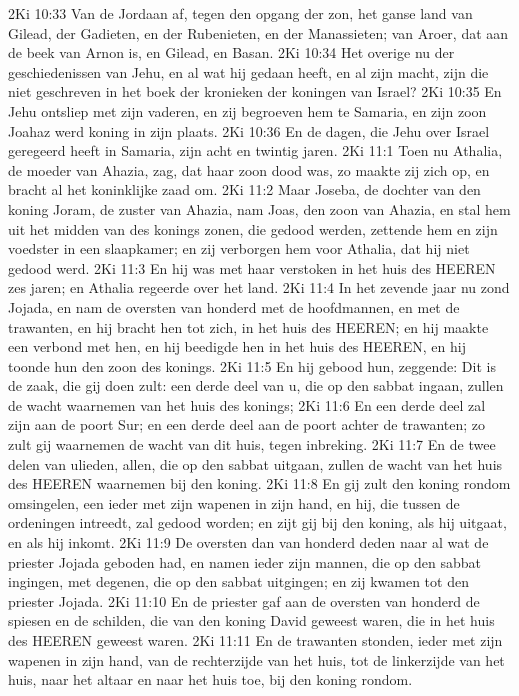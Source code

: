 2Ki 10:33  Van de Jordaan af, tegen den opgang der zon, het ganse land van Gilead, der Gadieten, en der Rubenieten, en der Manassieten; van Aroer, dat aan de beek van Arnon is, en Gilead, en Basan.
2Ki 10:34  Het overige nu der geschiedenissen van Jehu, en al wat hij gedaan heeft, en al zijn macht, zijn die niet geschreven in het boek der kronieken der koningen van Israel?
2Ki 10:35  En Jehu ontsliep met zijn vaderen, en zij begroeven hem te Samaria, en zijn zoon Joahaz werd koning in zijn plaats.
2Ki 10:36  En de dagen, die Jehu over Israel geregeerd heeft in Samaria, zijn acht en twintig jaren.
2Ki 11:1  Toen nu Athalia, de moeder van Ahazia, zag, dat haar zoon dood was, zo maakte zij zich op, en bracht al het koninklijke zaad om.
2Ki 11:2  Maar Joseba, de dochter van den koning Joram, de zuster van Ahazia, nam Joas, den zoon van Ahazia, en stal hem uit het midden van des konings zonen, die gedood werden, zettende hem en zijn voedster in een slaapkamer; en zij verborgen hem voor Athalia, dat hij niet gedood werd.
2Ki 11:3  En hij was met haar verstoken in het huis des HEEREN zes jaren; en Athalia regeerde over het land.
2Ki 11:4  In het zevende jaar nu zond Jojada, en nam de oversten van honderd met de hoofdmannen, en met de trawanten, en hij bracht hen tot zich, in het huis des HEEREN; en hij maakte een verbond met hen, en hij beedigde hen in het huis des HEEREN, en hij toonde hun den zoon des konings.
2Ki 11:5  En hij gebood hun, zeggende: Dit is de zaak, die gij doen zult: een derde deel van u, die op den sabbat ingaan, zullen de wacht waarnemen van het huis des konings;
2Ki 11:6  En een derde deel zal zijn aan de poort Sur; en een derde deel aan de poort achter de trawanten; zo zult gij waarnemen de wacht van dit huis, tegen inbreking.
2Ki 11:7  En de twee delen van ulieden, allen, die op den sabbat uitgaan, zullen de wacht van het huis des HEEREN waarnemen bij den koning.
2Ki 11:8  En gij zult den koning rondom omsingelen, een ieder met zijn wapenen in zijn hand, en hij, die tussen de ordeningen intreedt, zal gedood worden; en zijt gij bij den koning, als hij uitgaat, en als hij inkomt.
2Ki 11:9  De oversten dan van honderd deden naar al wat de priester Jojada geboden had, en namen ieder zijn mannen, die op den sabbat ingingen, met degenen, die op den sabbat uitgingen; en zij kwamen tot den priester Jojada.
2Ki 11:10  En de priester gaf aan de oversten van honderd de spiesen en de schilden, die van den koning David geweest waren, die in het huis des HEEREN geweest waren.
2Ki 11:11  En de trawanten stonden, ieder met zijn wapenen in zijn hand, van de rechterzijde van het huis, tot de linkerzijde van het huis, naar het altaar en naar het huis toe, bij den koning rondom.
